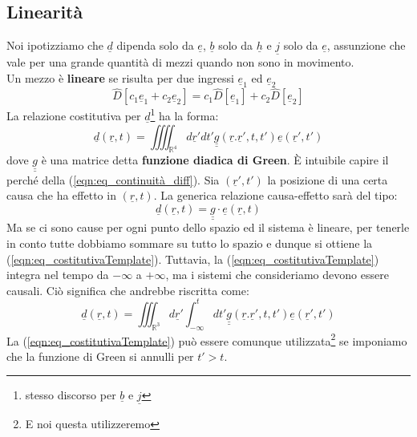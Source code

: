 \documentclass{book}
\begin{document}
            \subsection{Linearità}
            Noi ipotizziamo che $\underline{d}$ dipenda solo da $\underline{e}$, $\underline{b}$ solo da $\underline{h}$ e $\underline{j}$ solo da $\underline{e}$, assunzione che vale per una grande quantità di mezzi quando non sono in movimento. \\
            Un mezzo è \textbf{lineare} se risulta per due ingressi $\underline{e}_{1}$ ed $\underline{e}_{2}$ 
            \begin{equation}
            \hat{D}[c_{1}\underline{e}_{1}+c_{2}\underline{e}_{2}] = c_{1} \hat{D}[\underline{e}_{1}]+c_{2}\hat{D}[\underline{e}_{2}]
            \end{equation}
            La relazione costitutiva per $\underline{d}$\footnote{stesso discorso per $\underline{b}$ e $\underline{j}$} ha la forma:
            \begin{equation}
            \label{eqn:eq_costitutivaTemplate}
                \underline{d}(\underline{r},t) = \iiiint_{\mathbb{R}^{4}} d\underline{r}' dt' \underline{\underline{g}}(\underline{r}. \underline{r}', t, t') \underline{e}(\underline{r}', t')
            \end{equation}
            dove $\underline{\underline{g}}$ è una matrice detta \textbf{funzione diadica di Green}. È intuibile capire il perché della (\ref{eqn:eq_continuità_diff}). Sia $(\underline{r}', t')$ la posizione di una certa causa che ha effetto in $(\underline{r}, t)$. La generica relazione causa-effetto sarà del tipo:
            \begin{equation}
                \underline{d}(\underline{r}, t) = \underline{\underline{g}} \cdot\underline{e}(\underline{r}, t)
            \end{equation}
            Ma se ci sono cause per ogni punto dello spazio ed il sistema è lineare, per tenerle in conto tutte dobbiamo sommare su tutto lo spazio e dunque si ottiene la (\ref{eqn:eq_costitutivaTemplate}). Tuttavia, la (\ref{eqn:eq_costitutivaTemplate}) integra nel tempo da $-\infty$ a $+\infty$, ma i sistemi che consideriamo devono essere causali. Ciò significa che andrebbe riscritta come:
            \begin{equation}
                \underline{d}(\underline{r},t) = \iiint_{\mathbb{R}^{3}} d\underline{r}' \int_{-\infty} ^{t} dt' \underline{\underline{g}}(\underline{r}. \underline{r}', t, t') \underline{e}(\underline{r}', t')
            \end{equation}
            La (\ref{eqn:eq_costitutivaTemplate}) può essere comunque utilizzata\footnote{E noi questa utilizzeremo} se imponiamo che la funzione di Green si annulli per $t'>t$. 
\end{document}

